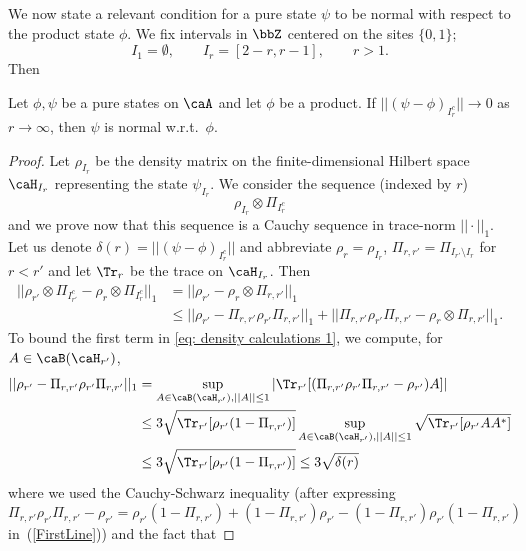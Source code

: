 We now state a relevant condition for a pure state $\psi$ to be normal with respect to the product state $\phi$. We fix intervals in $\bbZ$ centered on the sites $\{0,1\}$;
\begin{equation}\label{eq: intervals} 
	I_1=\emptyset, \qquad I_r=[2-r,r-1],\qquad  r>1.
\end{equation}
Then
\begin{lemma}\label{lem: condition for normality}
	Let $\phi,\psi$ be a pure states on $\caA$ and let $\phi$ be a product.
	If $||(\psi-\phi)_{I_r^c}|| \to 0$ as $r\to \infty$, then $\psi$ is normal w.r.t.\ $\phi$. 
\end{lemma}
\begin{proof}
	Let $\rho_{I_r}$ be the density matrix on the finite-dimensional Hilbert space $\caH_{I_r}$ representing the state $\psi_{I_r}$. 
	We consider the sequence (indexed by $r$)
	\begin{equation}\label{eq: converging sequence of states}
		\rho_{I_r} \otimes \Pi_{I_r^c}
	\end{equation}
	and we prove now that this sequence is a Cauchy sequence in trace-norm $||\cdot||_1$.
	Let us denote $\delta(r)=||(\psi-\phi)_{I_r^c}|| $ and abbreviate 
	$\rho_r=\rho_{I_r}$, $\Pi_{r,r'}=\Pi_{I_{r'}\setminus I_r}$ for $r<r'$ and let $\Tr_r$ be the trace on $\caH_{I_r}$. Then 
	\begin{align}
		|| \rho_{r'} \otimes \Pi_{I_{r'}^c}- \rho_r \otimes \Pi_{I_r^c} ||_1 &= 
		|| \rho_{r'} - \rho_r \otimes \Pi_{r,r'} ||_1 \\
		&\leq  
		|| \rho_{r'} - \Pi_{r,r'} \rho_{r'}\Pi_{r,r'} ||_1+ || \Pi_{r,r'} \rho_{r'}\Pi_{r,r'}-\rho_r \otimes \Pi_{r,r'} ||_1. \label{eq: density calculations 1}
	\end{align}
	To bound the first term in \eqref{eq: density calculations 1}, we compute, for $A\in \caB(\caH_{r'})$,
	\begin{align}
		|| \rho_{r'} - \Pi_{r,r'} \rho_{r'}\Pi_{r,r'} ||_1&=\sup_{A\in \caB(\caH_{r'}), ||A||\leq 1}
		|\Tr_{r'}[(\Pi_{r,r'} \rho_{r'}\Pi_{r,r'} - \rho_{r'})A] | \label{FirstLine}\\
		&\leq 3  \sqrt{\Tr_{r'} [\rho_{r'} (1-\Pi_{r,r'})]} \sup_{A\in \caB(\caH_{r'}), ||A||\leq 1}  \sqrt{\Tr_{r'} [\rho_{r'}AA^*]}     \\
		& \leq 3  \sqrt{\Tr_{r'} [\rho_{r'} (1-\Pi_{r,r'})]} \leq 3 \sqrt{\delta(r)}
	\end{align}
	where we used the Cauchy-Schwarz inequality (after expressing $\Pi_{r,r'} \rho_{r'}\Pi_{r,r'} - \rho_{r'} = \rho_{r'}(1-\Pi_{r,r'}) + (1-\Pi_{r,r'})\rho_{r'} - (1-\Pi_{r,r'})\rho_{r'}(1-\Pi_{r,r'})$ in~(\ref{FirstLine})) and the fact that 

\end{proof}
